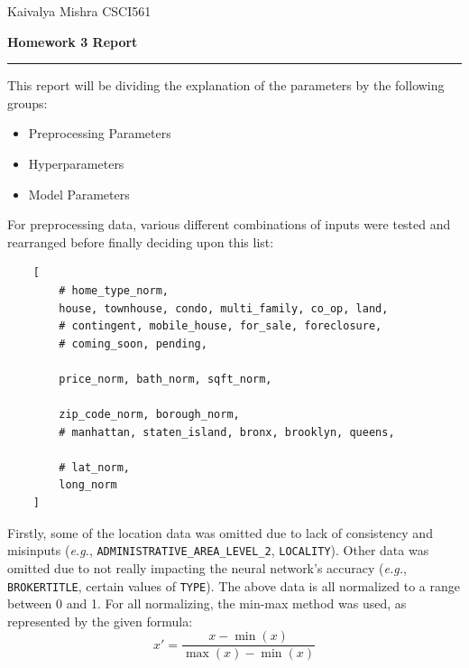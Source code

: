 \documentclass[12pt]{article}
\renewcommand{\baselinestretch}{1.5}
\begin{document}
\noindent Kaivalya Mishra \hfill CSCI561
{\center \Large \textbf{Homework 3 Report} \par}

\vspace{10pt}

\hrule

\vspace{10pt}


This report will be dividing the explanation of the parameters by the following groups:

\begin{itemize}[leftmargin=4em]
	\item Preprocessing Parameters
	\item Hyperparameters
	\item Model Parameters
\end{itemize}

\vspace{5pt}


For preprocessing data, various different combinations of inputs were tested and rearranged before finally deciding upon this list:

\renewcommand{\baselinestretch}{1.25}
\begin{verbatim}
    [
        # home_type_norm,
        house, townhouse, condo, multi_family, co_op, land,
        # contingent, mobile_house, for_sale, foreclosure,
        # coming_soon, pending,

        price_norm, bath_norm, sqft_norm,

        zip_code_norm, borough_norm,
        # manhattan, staten_island, bronx, brooklyn, queens,
        
        # lat_norm,
        long_norm
    ]
\end{verbatim}
\renewcommand{\baselinestretch}{1.5}

Firstly, some of the location data was omitted due to lack of consistency and misinputs (\textit{e.g.}, \verb|ADMINISTRATIVE_AREA_LEVEL_2|, \verb|LOCALITY|). Other data was omitted due to not really impacting the neural network's accuracy (\textit{e.g.}, \verb|BROKERTITLE|, certain values of \verb|TYPE|). The above data is all normalized to a range between 0 and 1. 
For all normalizing, the min-max method was used, as represented by the given formula:
\begin{equation*}
    x' = \frac{x - \min(x)}{\max(x) - \min(x)}
\end{equation*}
\end{document}
